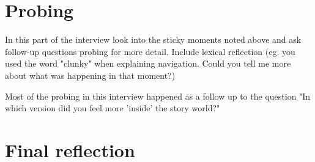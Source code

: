 \section{Probing}
In this part of the interview look into the sticky moments noted above and ask follow-up questions probing for more detail.
Include lexical reflection (eg. you used the word "clunky" when explaining navigation. Could you tell me more about what was happening
in that moment?)

Most of the probing in this interview happened as a follow up to the question "In which version did you feel more 'inside' the story world?"


\section{Final reflection}

